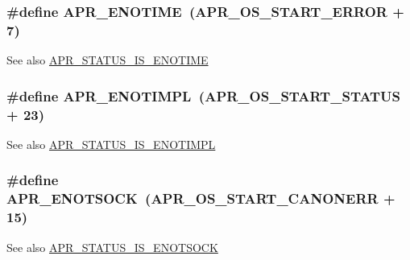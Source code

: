 \subsubsection[{\texorpdfstring{A\+P\+R\+\_\+\+E\+N\+O\+T\+I\+ME}{APR_ENOTIME}}]{\setlength{\rightskip}{0pt plus 5cm}\#define A\+P\+R\+\_\+\+E\+N\+O\+T\+I\+ME~({\bf A\+P\+R\+\_\+\+O\+S\+\_\+\+S\+T\+A\+R\+T\+\_\+\+E\+R\+R\+OR} + 7)}\hypertarget{group__APR__Error_ga7acfb436774a21ae93ff5c1b89e7c4f5}{}\label{group__APR__Error_ga7acfb436774a21ae93ff5c1b89e7c4f5}
\begin{DoxySeeAlso}{See also}
\hyperlink{group__APR__STATUS__IS_ga65cb54d0b5902784037626841e26e709}{A\+P\+R\+\_\+\+S\+T\+A\+T\+U\+S\+\_\+\+I\+S\+\_\+\+E\+N\+O\+T\+I\+ME} 
\end{DoxySeeAlso}
\subsubsection[{\texorpdfstring{A\+P\+R\+\_\+\+E\+N\+O\+T\+I\+M\+PL}{APR_ENOTIMPL}}]{\setlength{\rightskip}{0pt plus 5cm}\#define A\+P\+R\+\_\+\+E\+N\+O\+T\+I\+M\+PL~({\bf A\+P\+R\+\_\+\+O\+S\+\_\+\+S\+T\+A\+R\+T\+\_\+\+S\+T\+A\+T\+US} + 23)}\hypertarget{group__APR__Error_ga939ddb834a30bc9a5a0a329b13000161}{}\label{group__APR__Error_ga939ddb834a30bc9a5a0a329b13000161}
\begin{DoxySeeAlso}{See also}
\hyperlink{group__APR__STATUS__IS_gacab882e24f5d6491777e8ef7763d02fb}{A\+P\+R\+\_\+\+S\+T\+A\+T\+U\+S\+\_\+\+I\+S\+\_\+\+E\+N\+O\+T\+I\+M\+PL} 
\end{DoxySeeAlso}
\subsubsection[{\texorpdfstring{A\+P\+R\+\_\+\+E\+N\+O\+T\+S\+O\+CK}{APR_ENOTSOCK}}]{\setlength{\rightskip}{0pt plus 5cm}\#define A\+P\+R\+\_\+\+E\+N\+O\+T\+S\+O\+CK~({\bf A\+P\+R\+\_\+\+O\+S\+\_\+\+S\+T\+A\+R\+T\+\_\+\+C\+A\+N\+O\+N\+E\+RR} + 15)}\hypertarget{group__APR__Error_gad456312527050c661dc19a8f17a0f0ef}{}\label{group__APR__Error_gad456312527050c661dc19a8f17a0f0ef}
\begin{DoxySeeAlso}{See also}
\hyperlink{group__APR__STATUS__IS_ga7b7807755d3d6f24e9978337b9faa5a1}{A\+P\+R\+\_\+\+S\+T\+A\+T\+U\+S\+\_\+\+I\+S\+\_\+\+E\+N\+O\+T\+S\+O\+CK} 
\end{DoxySeeAlso}
